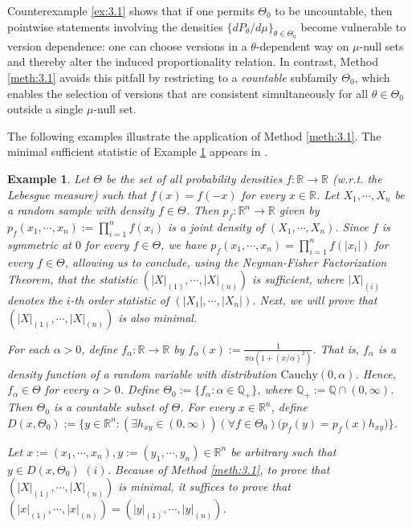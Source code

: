 \documentclass[12pt]{article}
\newtheorem{example}{Example}[section]
\begin{document}
Counterexample \ref{ex:3.1} shows that if one permits $\Theta_0$ to be uncountable, then pointwise statements involving the densities $\{dP_\theta/d\mu\}_{\theta\in\Theta_0}$ become vulnerable to version dependence: one can choose versions in a $\theta$-dependent way on $\mu$-null sets and thereby alter the induced proportionality relation. In contrast, Method \ref{meth:3.1} avoids this pitfall by restricting to a \emph{countable} subfamily $\Theta_0$, which enables the selection of versions that are consistent simultaneously for all $\theta\in\Theta_0$ outside a single $\mu$-null set.

The following examples illustrate the application of Method \ref{meth:3.1}. The minimal sufficient statistic of Example \ref{ex:4.1} appears in \citet{Thomas2021}.

\begin{example}
\label{ex:4.1}
Let $\Theta$ be the set of all probability densities $f:\mathbb{R}\to \mathbb{R}$ (w.r.t. the Lebesgue measure) such that $f(x)=f(-x)$ for every $x\in\mathbb{R}$. Let $X_1,\cdots, X_n$ be a random sample with density $f\in \Theta $. Then $p_f:\mathbb{R}^n\to \mathbb{R}$ given by $p_f(x_1,\cdots, x_n):=\prod _{i=1}^nf(x_i)$ is a joint density of $(X_1,\cdots,X_n)$. Since $f$ is symmetric at $0$ for every $f\in \Theta$, we have $p_f(x_1,\cdots, x_n)=\prod _{i=1}^nf(|x_i|)$ for every $f\in \Theta$, allowing us to conclude, using the Neyman-Fisher Factorization Theorem, that the statistic $(|X|_{(1)},\cdots,|X|_{(n)})$ is sufficient, where $|X|_{(i)}$ denotes the $i$-th order statistic of $(|X_1|,\cdots, |X_n|)$. Next, we will prove that $(|X|_{(1)},\cdots,|X|_{(n)})$ is also minimal.

For each $\alpha >0$, define $f_\alpha:\mathbb{R}\to \mathbb{R}$ by $f_\alpha (x):=\frac{1}{\pi\alpha (1+(x/\alpha )^2)}$. That is, $f_\alpha $ is a density function of a random variable with distribution $\text{Cauchy}(0,\alpha )$. Hence, $f_\alpha \in \Theta$ for every $\alpha >0$. Define $\Theta _0:=\{f_\alpha :\alpha \in \mathbb{Q}_+\}$, where $\mathbb{Q}_+:=\mathbb{Q}\cap (0,\infty )$. Then $\Theta _0$ is a countable subset of $\Theta$. For every $x\in\mathbb{R}^n$, define $D(x ,\Theta _0):=\big\{y\in \mathbb{R}^n:(\exists h_{xy}\in (0,\infty ))(\forall f\in \Theta_0 )\big(p_f(y)=p_f (x)h_{xy}\big)\big\}$.

Let $x:=(x_1,\cdots, x_n),y:=(y_1,\cdots, y_n)\in\mathbb{R}^n$ be arbitrary such that $y\in D(x,\Theta _0)\,\,(i)$. Because of Method \ref{meth:3.1}, to prove that $(|X|_{(1)},\cdots,|X|_{(n)})$ is minimal, it suffices to prove that $(|x|_{(1)},\cdots, |x|_{(n)})=(|y|_{(1)},\cdots, |y|_{(n)})$.


\end{example}
\end{document}
